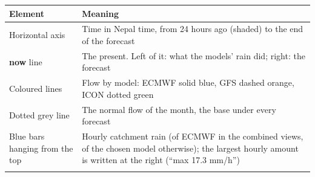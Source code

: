 \documentclass[
  10pt,
]{article}
\begin{document}
\begin{longtable}[]{@{}ll@{}}
\toprule
\begin{minipage}[b]{0.47\columnwidth}\raggedright
Element\strut
\end{minipage} & \begin{minipage}[b]{0.47\columnwidth}\raggedright
Meaning\strut
\end{minipage}\tabularnewline
\midrule
\endhead
\begin{minipage}[t]{0.47\columnwidth}\raggedright
Horizontal axis\strut
\end{minipage} & \begin{minipage}[t]{0.47\columnwidth}\raggedright
Time in Nepal time, from 24 hours ago (shaded) to the end of the
forecast\strut
\end{minipage}\tabularnewline
\begin{minipage}[t]{0.47\columnwidth}\raggedright
\textbf{now} line\strut
\end{minipage} & \begin{minipage}[t]{0.47\columnwidth}\raggedright
The present. Left of it: what the models' rain did; right: the
forecast\strut
\end{minipage}\tabularnewline
\begin{minipage}[t]{0.47\columnwidth}\raggedright
Coloured lines\strut
\end{minipage} & \begin{minipage}[t]{0.47\columnwidth}\raggedright
Flow by model: ECMWF solid blue, GFS dashed orange, ICON dotted
green\strut
\end{minipage}\tabularnewline
\begin{minipage}[t]{0.47\columnwidth}\raggedright
Dotted grey line\strut
\end{minipage} & \begin{minipage}[t]{0.47\columnwidth}\raggedright
The normal flow of the month, the base under every forecast\strut
\end{minipage}\tabularnewline
\begin{minipage}[t]{0.47\columnwidth}\raggedright
Blue bars hanging from the top\strut
\end{minipage} & \begin{minipage}[t]{0.47\columnwidth}\raggedright
Hourly catchment rain (of ECMWF in the combined views, of the chosen
model otherwise); the largest hourly amount is written at the right
(``max 17.3 mm/h'')\strut
\end{minipage}\tabularnewline
\begin{minipage}[t]{0.47\columnwidth}\raggedright

\end{minipage}
\end{longtable}
\end{document}
